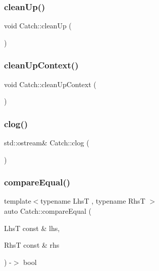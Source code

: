 \mbox{\label{namespace_catch_a0f78e9afdebc6d4512d18e76fbf54b8c}} 
\subsubsection{cleanUp()}
{\footnotesize\ttfamily void Catch\+::clean\+Up (\begin{DoxyParamCaption}{ }\end{DoxyParamCaption})}

\mbox{\label{namespace_catch_ae50508f10ffc4ed873a31a4db4caea16}} 
\subsubsection{cleanUpContext()}
{\footnotesize\ttfamily void Catch\+::clean\+Up\+Context (\begin{DoxyParamCaption}{ }\end{DoxyParamCaption})}

\mbox{\label{namespace_catch_a5a0677089050dcdb4848f56fb47e9279}} 
\subsubsection{clog()}
{\footnotesize\ttfamily std\+::ostream\& Catch\+::clog (\begin{DoxyParamCaption}{ }\end{DoxyParamCaption})}

\mbox{\label{namespace_catch_af89b8df30cfaf09abd048c6ff67359ee}} 
\subsubsection{compareEqual()\hspace{0.1cm}{\footnotesize\ttfamily [1/5]}}
{\footnotesize\ttfamily template$<$typename LhsT , typename RhsT $>$ \\
auto Catch\+::compare\+Equal (\begin{DoxyParamCaption}\item[{LhsT const \&}]{lhs,  }\item[{RhsT const \&}]{rhs }\end{DoxyParamCaption}) -\/$>$ bool }

